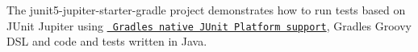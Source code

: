 The {\ttfamily junit5-\/jupiter-\/starter-\/gradle} project demonstrates how to run tests based on J\+Unit Jupiter using \href{https://docs.gradle.org/current/userguide/java_testing.html\#using_junit5}{\texttt{ Gradle\textquotesingle{}s native J\+Unit Platform support}}, Gradle\textquotesingle{}s Groovy D\+SL and code and tests written in Java. 